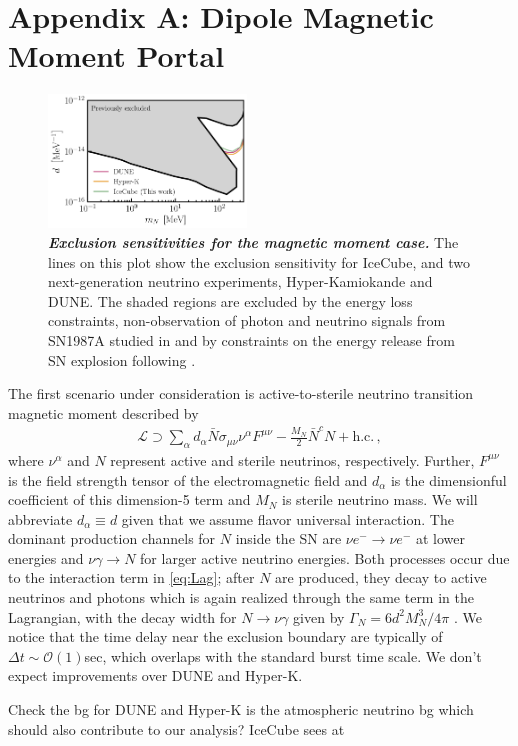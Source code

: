 \section{Appendix A: Dipole Magnetic Moment Portal}
\begin{figure}[t!]
    \centering
    \includegraphics[width=0.47\textwidth]{figures/magnetic_moment_sensitivity}
    \caption{\textbf{\textit{Exclusion sensitivities for the magnetic moment case.}}
    The lines on this plot show the exclusion sensitivity for IceCube, and two next-generation neutrino experiments, Hyper-Kamiokande and DUNE. The shaded regions are excluded by the energy loss constraints, non-observation of photon and neutrino signals from SN1987A studied in \cite{Brdar:2023tmi} and by   constraints on the energy release from SN explosion following \cite{PhysRevLett.128.221103}.
    }
    \label{fig:magnetic_moment_sensitivity}
\end{figure}
The first scenario under consideration is active-to-sterile neutrino transition magnetic moment described by \cite{Magill:2018jla,Brdar:2020quo,Brdar:2023tmi}
\begin{align}
    \mathcal{L} \supset \sum_\alpha d_\alpha \bar{N}\sigma_{\mu\nu} \nu^{\alpha} F^{\mu\nu}-\frac{M_N}{2} \bar{N}^c N + \text{h.c.}\,,
    \label{eq:Lag}
\end{align}
where $\nu^{\alpha}$ and $N$ represent active and sterile neutrinos, respectively. Further, $F^{\mu\nu}$ is the field strength tensor of the electromagnetic field and $d_\alpha$ is the dimensionful coefficient of this dimension-5 term and $M_N$ is sterile neutrino mass. We will abbreviate $d_\alpha \equiv d$ given that we assume flavor universal interaction. The dominant production channels for $N$ inside the SN are $\nu e^- \to \nu e^-$ at lower energies and $\nu \gamma \to N$ for larger active neutrino energies. Both processes occur due to the interaction term in \cref{eq:Lag}; after $N$ are produced, they decay to active neutrinos and photons which is again realized through the same term in the Lagrangian, with the decay width for $N\to\nu\gamma$ given by $\Gamma_N = 6d^2 M_N^3/4 \pi$ \cite{Plestid:2020vqf}. We notice that the time delay near the exclusion boundary are typically of $\Delta t \sim \mathcal{O}(1)$sec, which overlaps with the standard burst time scale. We don't expect improvements over DUNE and Hyper-K. 

{\color{red} Check the bg for DUNE and Hyper-K is the atmospheric neutrino bg which should also contribute to our analysis? IceCube sees at}